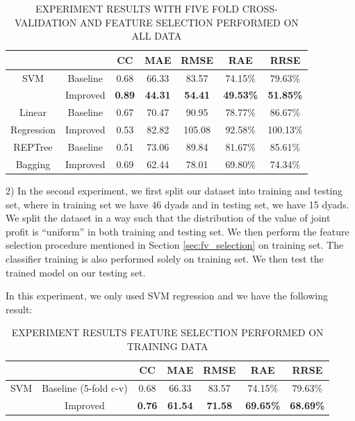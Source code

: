 \documentclass[11pt]{article} %
\begin{document}
\begin{table}
  \centering
  \caption{EXPERIMENT RESULTS WITH FIVE FOLD CROSS-VALIDATION AND FEATURE SELECTION PERFORMED ON ALL DATA}
  \begin{tabular}{|c|c|c|c|c|c|c|}
     \hline
         &       & CC & MAE & RMSE & RAE & RRSE\\
     \hline
     SVM & Baseline & 0.68  & 66.33  & 83.57  & 74.15\%  & 79.63\%\\
         & Improved & \textbf{0.89}  & \textbf{44.31 } & \textbf{54.41}  & \textbf{49.53\% } & \textbf{51.85\%}\\
     \hline
  Linear & Baseline &  0.67 & 70.47  & 90.95  & 78.77\% & 86.67\%\\
  Regression & Improved & 0.53 & 82.82 & 105.08  & 92.58\%  & 100.13\%  \\
  \hline
  REPTree & Baseline &  0.51 & 73.06  & 89.84  & 81.67\%  & 85.61\%\\
  Bagging & Improved &  0.69 & 62.44  & 78.01  & 69.80\%  & 74.34\%\\
  \hline
  \end{tabular}\label{tab:result2}
\end{table}

2) In the second experiment, we first split our dataset into training and testing set, where in training set we have 46 dyads and in testing set, we have 15 dyads. We split the dataset in a way such that the distribution of the value of joint profit is ``uniform'' in both training and testing set.
We then perform the feature selection procedure mentioned in Section \ref{sec:fv_selection} on training set. The classifier training is also performed solely on training set. We then test the trained model on our testing set.

In this experiment, we only used SVM regression and we have the following result:

\begin{table}
  \centering
  \caption{EXPERIMENT RESULTS FEATURE SELECTION PERFORMED ON TRAINING DATA}
  \begin{tabular}{|c|c|c|c|c|c|c|}
     \hline
         &       & CC & MAE & RMSE & RAE & RRSE\\
     \hline
     SVM & Baseline (5-fold c-v)& 0.68  & 66.33  & 83.57  & 74.15\%  & 79.63\%\\
         & Improved & \textbf{0.76}  & \textbf{61.54 } & \textbf{71.58}  & \textbf{69.65\% } & \textbf{68.69\%}\\
  \hline
  \end{tabular}\label{tab:result3}
\end{table}
\end{document}
